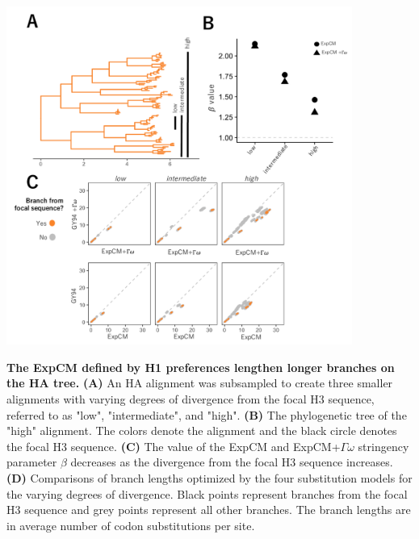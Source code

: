 \documentclass[11pt]{article}
\begin{document}
\begin{suppfig}[H]
\centerline{\includegraphics[width=0.85\textwidth]{figures/lee_compete}}
\caption{\label{fig:lee_compete}
\textbf{The ExpCM defined by H1 preferences lengthen longer branches on the HA tree.} 
\textbf{(A)} An HA alignment was subsampled to create three smaller alignments with varying degrees of divergence from the focal H3 sequence, referred to as "low", "intermediate", and "high". 
\textbf{(B)} The phylogenetic tree of the "high" alignment. 
The colors denote the alignment and the black circle denotes the focal H3 sequence. 
\textbf{(C)} The value of the ExpCM and ExpCM+$\Gamma\omega$ stringency parameter $\beta$ decreases as the divergence from the focal H3 sequence increases. 
\textbf{(D)} Comparisons of branch lengths optimized by the four substitution models for the varying degrees of divergence. 
Black points represent branches from the focal H3 sequence and grey points represent all other branches.  
The branch lengths are in average number of codon substitutions per site. 
}
\end{suppfig}


\clearpage 


\end{document}

